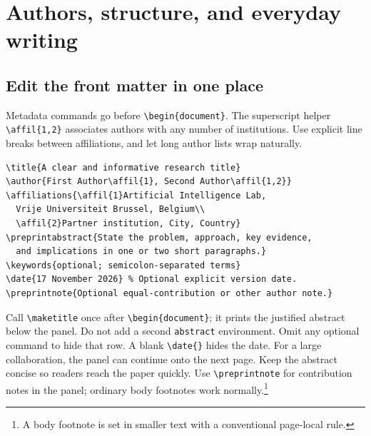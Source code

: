 \documentclass[11pt]{article}
\begin{document}
\clearpage %
\section{Authors, structure, and everyday writing}
\subsection{Edit the front matter in one place}
Metadata commands go before \verb|\begin{document}|. The superscript helper
\verb|\affil{1,2}| associates authors with any number of institutions. Use explicit
line breaks between affiliations, and let long author lists wrap naturally.
\begin{lstlisting}
\title{A clear and informative research title}
\author{First Author\affil{1}, Second Author\affil{1,2}}
\affiliations{\affil{1}Artificial Intelligence Lab,
  Vrije Universiteit Brussel, Belgium\\
  \affil{2}Partner institution, City, Country}
\preprintabstract{State the problem, approach, key evidence,
  and implications in one or two short paragraphs.}
\keywords{optional; semicolon-separated terms}
\date{17 November 2026} % Optional explicit version date.
\preprintnote{Optional equal-contribution or other author note.}
\end{lstlisting}
Call \verb|\maketitle| once after \verb|\begin{document}|; it prints the justified abstract
below the panel. Do not add a second \texttt{abstract} environment. Omit any
optional command to hide that row. A blank \verb|\date{}| hides the date. For a
large collaboration, the panel can continue onto the next page. Keep the abstract
concise so readers reach the paper quickly. Use \verb|\preprintnote| for
contribution notes in the panel; ordinary body footnotes work normally.\footnote{A body footnote is set in smaller text with a conventional page-local rule.}
\end{document}
